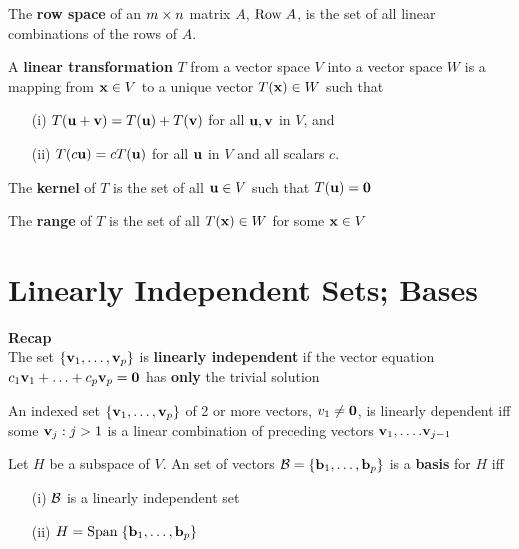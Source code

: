 \documentclass{report}
\begin{document}
\begin{definition}
    The \textbf{row space} of an $m \times n$ matrix $A$, $\mathrm{Row}\; A$, is the
    set of all linear combinations of the rows of $A$. 
\end{definition}


\begin{definition}
    A \textbf{linear transformation} $T$ from a vector space $V$ into a vector space
    $W$ is a mapping from $\mathbf{x} \in  V$ to a unique vector $T(\mathbf{x}) \in W$ such that
    \begin{itemize}[]
        \item[(i)] $T(\mathbf{u} + \mathbf{v}) = T(\mathbf{u}) + T(\mathbf{v})$ \quad for all $\mathbf{u}, \mathbf{v}$ in $V$, and
        \item[(ii)] $T(c \mathbf{u}) = c T(\mathbf{u})$ \quad for all $\mathbf{u}$ in $V$ and all scalars $c$.
    \end{itemize}
\end{definition}

\begin{definition}
    The \textbf{kernel} of $T$ is the set of all $\mathbf{u} \in V$ such that $T(\mathbf{u}) = \mathbf{0}$
\end{definition}

\begin{definition}
    The \textbf{range} of $T$ is the set of all $T(\mathbf{x}) \in W$ for some $\mathbf{x} \in V$
\end{definition}

\section{Linearly Independent Sets; Bases}
\textbf{Recap}\\
The set $\{\mathbf{v}_1, \dots, \mathbf{v}_p\}$ is \textbf{linearly independent} if the 
vector equation $c_1 \mathbf{v}_1 + \ldots + c_p \mathbf{v}_p = \mathbf{0} $
has \textbf{only} the trivial solution

\begin{theorem}
    An indexed set $\{\mathbf{v}_1, \dots, \mathbf{v}_p\}$ of 2 or more vectors, $v_1 \ne \mathbf{0}$,
    is linearly dependent iff some $\mathbf{v}_j: j > 1$ is a linear combination of 
    preceding vectors $\mathbf{v}_1, \ldots. \mathbf{v}_{j-1}$
\end{theorem}

\begin{definition}
    Let $H$ be a subspace of $V$.
    An set of vectors $\mathcal{B} = \{\mathbf{b}_1, \dots, \mathbf{b}_p\}$ is a \textbf{basis} for
    $H$ iff
    \begin{enumerate}
        \item[(i)] $\mathcal{B}$ is a linearly independent set
        \item[(ii)] $H = \mathrm{Span}\; \{\mathbf{b}_1, \dots, \mathbf{b}_p\}$
    \end{enumerate}
\end{definition}
\end{document}
